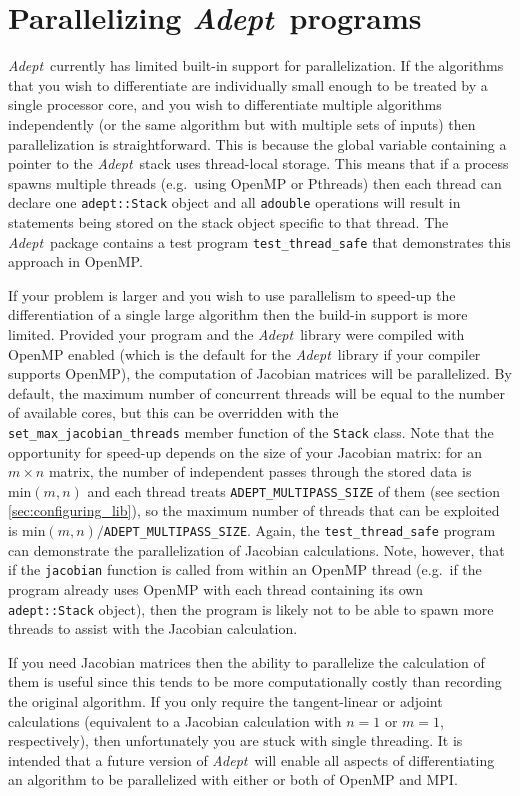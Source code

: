 \documentclass[a4,oneside]{book}
\def\codesize{\small}
\def\Adept{\emph{Adept}}
\def\code#1{{\codesize\texttt{#1}}}
\begin{document}
\section{Parallelizing \Adept\ programs}
\Adept\ currently has limited built-in support for parallelization. If
the algorithms that you wish to differentiate are individually small
enough to be treated by a single processor core, and you wish to
differentiate multiple algorithms independently (or the same algorithm
but with multiple sets of inputs) then parallelization is
straightforward. This is because the global variable containing a
pointer to the \Adept\ stack uses thread-local storage.  This means
that if a process spawns multiple threads (e.g.\ using OpenMP or
Pthreads) then each thread can declare one \code{adept::Stack} object
and all \code{adouble} operations will result in statements being
stored on the stack object specific to that thread.  The
\Adept\ package contains a test program \code{test\_thread\_safe} that
demonstrates this approach in OpenMP.

If your problem is larger and you wish to use parallelism to speed-up
the differentiation of a single large algorithm then the build-in
support is more limited. Provided your program and the \Adept\ library
were compiled with OpenMP enabled (which is the default for the
\Adept\ library if your compiler supports OpenMP), the computation of
Jacobian matrices will be parallelized.  By default, the maximum
number of concurrent threads will be equal to the number of available
cores, but this can be overridden with the
\code{set\_max\_jacobian\_threads} member function of the \code{Stack}
class.  Note that the opportunity for speed-up depends on the size of
your Jacobian matrix: for an $m\times n$ matrix, the number of
independent passes through the stored data is $\mathrm{min}(m,n)$ and
each thread treats \code{ADEPT\_MULTIPASS\_SIZE} of them (see section
\ref{sec:configuring_lib}), so the maximum number of threads that can
be exploited is $\mathrm{min}(m,n)/$\code{ADEPT\_MULTIPASS\_SIZE}.
Again, the \code{test\_thread\_safe} program can demonstrate the
parallelization of Jacobian calculations.  Note, however, that if the
\code{jacobian} function is called from within an OpenMP thread
(e.g.\ if the program already uses OpenMP with each thread containing
its own \code{adept::Stack} object), then the program is likely not to
be able to spawn more threads to assist with the Jacobian calculation.

If you need Jacobian matrices then the ability to parallelize the
calculation of them is useful since this tends to be more
computationally costly than recording the original algorithm.  If you
only require the tangent-linear or adjoint calculations (equivalent to
a Jacobian calculation with $n=1$ or $m=1$, respectively), then
unfortunately you are stuck with single threading. It is intended that
a future version of \Adept\ will enable all aspects of differentiating
an algorithm to be parallelized with either or both of OpenMP and MPI.
\end{document}
